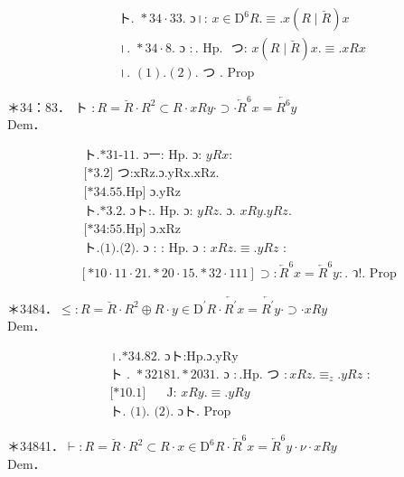 \documentclass[10pt]{article}
\begin{document}
\begin{align*}
& \text { ト. } * 34 \cdot 33 . \text { ɔ।: } x \in \mathrm{D}^{6} R . \equiv . x(R \mid \breve{R}) x  \tag{1}\\
& \text { ।. } * 34 \cdot 8 . \text { ɔ }: . \text { Hp. } \text { つ: } x(R \mid \breve{R}) x . \equiv . x R x  \tag{2}\\
& \text { ।. }(1) .(2) . \text { つ } . \text { Prop }
\end{align*}


＊34：83． ト $: R=\breve{R} \cdot R^{2} \subset R \cdot x R y \cdot \supset \cdot \overleftarrow{R}^{6} x=\overleftarrow{R^{6}} y$\\
Dem．


\begin{align*}
& \text { ト.*31-11. ɔㅡ: Hp. ɔ: } y R x: \\
& \text { [*3.2] つ:xRz.ɔ.yRx.xRz. } \\
& \text { [*34.55.Hp] ɔ.yRz }  \tag{1}\\
& \text { ト.*3.2. ɔト:. Hp. ɔ: } y R z . \text { ɔ. } x R y . y R z \text {. } \\
& \text { [*34:55.Hp] ɔ.xRz }  \tag{2}\\
& \text { ト.(1).(2). ɔ : : Hp. ɔ : } x R z . \equiv . y R z \text { : } \\
& {[* 10 \cdot 11 \cdot 21 . * 20 \cdot 15 . * 32 \cdot 111] \supset: \overleftarrow{R}^{6} x=\overleftarrow{R}^{6} y: . \text { ว!. Prop }}
\end{align*}


＊3484．$\leqslant: R=\breve{R} \cdot R^{2} \oplus R \cdot y \in \mathrm{D}^{\prime} R \cdot \overleftarrow{R^{\prime}} x=\overleftarrow{R^{\prime}} y \cdot \supset \cdot x R y$\\
Dem．


\begin{align*}
& \text { ।.*34.82. ɔト:Hp.ɔ.yRy }  \tag{1}\\
& \text { ト . } * 32181 . * 2031 . \text { ɔ }: . \mathrm{Hp} . \text { つ }: x R z . \equiv_{z} . y R z \text { : } \\
& \text { [*10.1] } \quad \text { J: } x R y . \equiv . y R y  \tag{2}\\
& \text { ト. (1). (2). ɔト. Prop }
\end{align*}


＊34841．$\vdash: R=\breve{R} \cdot R^{2} \subset R \cdot x \in \mathrm{D}^{6} R \cdot \overleftarrow{R}^{6} x=\overleftarrow{R}^{6} y \cdot \nu \cdot x R y$\\
Dem．
\end{document}
